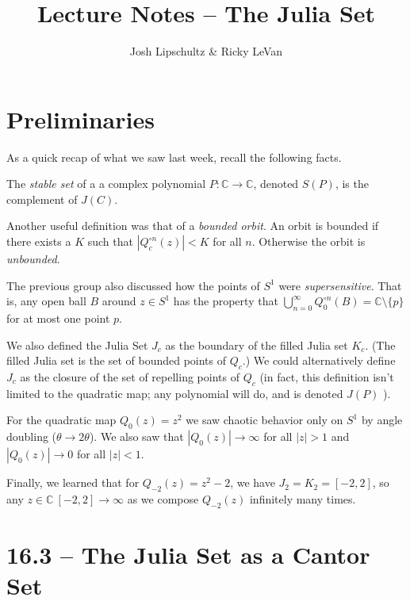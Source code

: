 \documentclass[symmetric]{tufte-handout}
\title{Lecture Notes -- The Julia Set}
\author{Josh Lipschultz \& Ricky LeVan}
\date{}  %
\begin{document}
\maketitle%



\section{Preliminaries}\label{sec:problem-1}

As a quick recap of what we saw last week, recall the following facts.

The \textsl{stable set} of a a complex polynomial $P: \mathbb{C} \rightarrow \mathbb{C}$, denoted $S(P)$, is the complement of $J(C)$.

Another useful definition was that of a \textsl{bounded orbit}. An orbit is bounded if there exists a $K$ such that $|Q_c^{\circ n}(z)| < K$ for all $n$. Otherwise the orbit is \textsl{unbounded}.

The previous group also discussed how the points of $S^1$ were \textsl{supersensitive}. That is, any open ball $B$ around $z \in S^1$ has the property that $\bigcup_{n=0}^\infty Q_0^{\circ n} (B) = \mathbb{C} \setminus \{p\}$ for at most one point $p$.

We also defined the Julia Set $J_c$ as the boundary of the filled Julia set $K_c$. (The filled Julia set is the set of bounded points of $Q_c$.) We could alternatively define $J_c$ as the closure of the set of repelling points of $Q_c$ (in fact, this definition isn't limited to the quadratic map; any polynomial will do, and is denoted $J(P)$ ).

For the quadratic map $Q_0(z) = z^2$ we saw chaotic behavior only on $S^1$ by angle doubling ($\theta \rightarrow 2\theta$). We also saw that $|Q_0(z)| \rightarrow \infty$ for all $|z| > 1$ and $|Q_0(z)| \rightarrow 0$ for all $|z| < 1$.

Finally, we learned that for $Q_{-2}(z) = z^2 - 2$, we have $J_2 = K_2 = [-2, 2]$, so any $z \in \mathbb{C} \ [-2,2] \rightarrow \infty$ as we compose $Q_{-2}(z)$ infinitely many times. 



\section{16.3 -- The Julia Set as a Cantor Set}\label{sec:problem-1}

\end{document}
